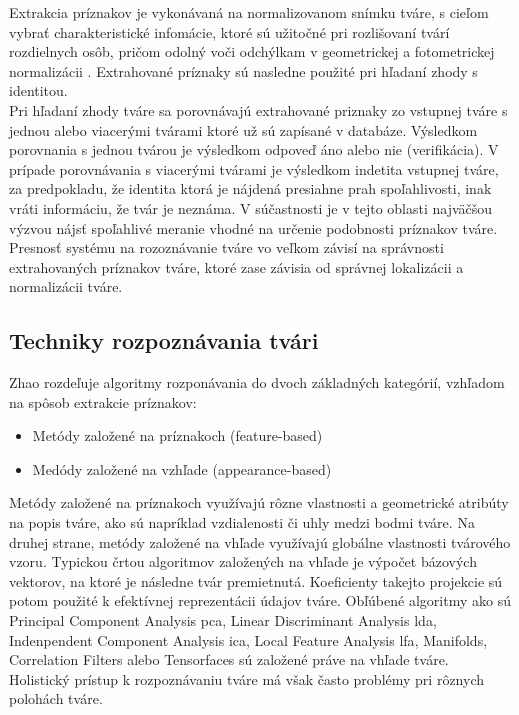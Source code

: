 \indent Extrakcia príznakov je vykonávaná na normalizovanom snímku tváre, s cieľom vybrať charakteristické infomácie, ktoré sú užitočné pri rozlišovaní tvárí rozdielnych osôb,
pričom odolný voči odchýlkam v geometrickej a fotometrickej normalizácii \cite{handbookface}.
Extrahované príznaky sú nasledne použité pri hľadaní zhody s identitou.\\

\indent Pri hľadaní zhody tváre sa porovnávajú extrahované priznaky zo vstupnej tváre s jednou alebo viacerými tvárami ktoré už sú zapísané v databáze.
Výsledkom porovnania s jednou tvárou je výsledkom odpoveď áno alebo nie (verifikácia).
V prípade porovnávania s viacerými tvárami je výsledkom indetita vstupnej tváre, za predpokladu, že identita ktorá je nájdená presiahne prah spoľahlivosti,
inak vráti informáciu, že tvár je neznáma.
V súčastnosti je v tejto oblasti najväčšou výzvou nájsť spoľahlivé meranie vhodné na určenie podobnosti príznakov tváre.\\
\indent Presnosť systému na rozoznávanie tváre vo veľkom závisí na správnosti extrahovaných príznakov tváre, ktoré zase závisia od správnej lokalizácii a normalizácii tváre.

\subsection{Techniky rozpoznávania tvári}
Zhao rozdeľuje\cite{zhao2003face} algoritmy rozponávania do dvoch základných kategórií, vzhľadom na spôsob extrakcie príznakov:

\begin{itemize}
	\item Metódy založené na príznakoch (feature-based)
	\item Medódy založené na vzhľade (appearance-based)
\end{itemize}

Metódy založené na príznakoch využívajú rôzne vlastnosti a geometrické atribúty na popis tváre, ako sú napríklad vzdialenosti či uhly medzi bodmi tváre.
Na druhej strane, metódy založené na vhľade využívajú globálne vlastnosti tvárového vzoru.
Typickou črtou algoritmov založených na vhľade je výpočet bázových vektorov, na ktoré je následne tvár premietnutá.
Koeficienty takejto projekcie sú potom použité k efektívnej reprezentácii údajov tváre\cite{handbookbio}.
Obľúbené algoritmy ako sú Principal Component Analysis \acrshort{pca}, Linear Discriminant Analysis \acrshort{lda}, Indenpendent Component Analysis \acrshort{ica},
Local Feature Analysis \acrshort{lfa}, Manifolds, Correlation Filters alebo Tensorfaces sú založené práve na vhľade tváre.
Holistický prístup k rozpoznávaniu tváre má však často problémy pri rôznych polohách tváre\cite{handbookbio}.

